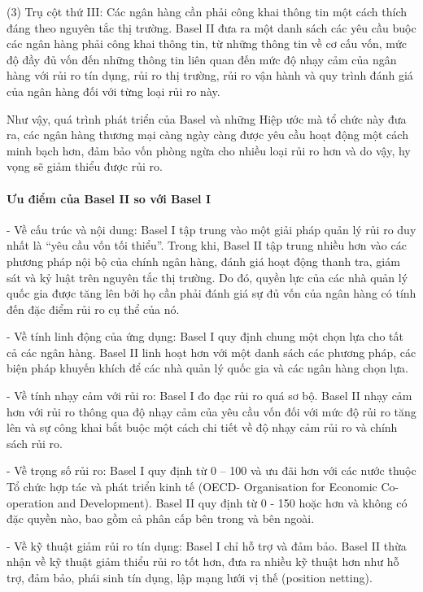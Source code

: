(3) Trụ cột thứ III: Các ngân hàng cần phải công khai thông tin một cách thích đáng theo nguyên tắc thị trường. Basel II đưa ra một danh sách các yêu cầu buộc các ngân hàng phải công khai thông tin, từ những thông tin về cơ cấu vốn, mức độ đầy đủ vốn đến những thông tin liên quan đến mức độ nhạy cảm của ngân hàng với rủi ro tín dụng, rủi ro thị trường, rủi ro vận hành và quy trình đánh giá của ngân hàng đối với từng loại rủi ro này.

Như vậy, quá trình phát triển của Basel và những Hiệp ước mà tổ chức này đưa ra, các ngân hàng thương mại càng ngày càng được yêu cầu hoạt động một cách minh bạch hơn, đảm bảo vốn phòng ngừa cho nhiều loại rủi ro hơn và do vậy, hy vọng sẽ giảm thiểu được rủi ro.

\paragraph{Ưu điểm của Basel II so với Basel I}

- Về cấu trúc và nội dung: Basel I tập trung vào một giải pháp quản lý rủi ro duy nhất là “yêu cầu vốn tối thiểu”. Trong khi, Basel II tập trung nhiều hơn vào các phương pháp nội bộ của chính ngân hàng, đánh giá hoạt động thanh tra, giám sát và kỷ luật trên nguyên tắc thị trường. Do đó, quyền lực của các nhà quản lý quốc gia được tăng lên bởi họ cần phải đánh giá sự đủ vốn của ngân hàng có tính đến đặc điểm rủi ro cụ thể của nó.

- Về tính linh động của ứng dụng: Basel I quy định chung một chọn lựa cho tất cả các ngân hàng. Basel II linh hoạt hơn với một danh sách các phương pháp, các biện pháp khuyến khích để các nhà quản lý quốc gia và các ngân hàng chọn lựa.

- Về tính nhạy cảm với rủi ro: Basel I đo đạc rủi ro quá sơ bộ. Basel II nhạy cảm hơn với rủi ro thông qua độ nhạy cảm của yêu cầu vốn đối với mức độ rủi ro tăng lên và sự công khai bắt buộc một cách chi tiết về độ nhạy cảm rủi ro và chính sách rủi ro.

- Về trọng số rủi ro: Basel I quy định từ 0 – 100 và ưu đãi hơn với các nước thuộc Tổ chức hợp tác và phát triển kinh tế (OECD- Organisation for Economic Co-operation and Development). Basel II quy định từ 0 - 150 hoặc hơn và không có đặc quyền nào, bao gồm cả phân cấp bên trong và bên ngoài.

- Về kỹ thuật giảm rủi ro tín dụng: Basel I chỉ hỗ trợ và đảm bảo. Basel II thừa nhận về kỹ thuật giảm thiểu rủi ro tốt hơn, đưa ra nhiều kỹ thuật hơn như hỗ trợ, đảm bảo, phái sinh tín dụng, lập mạng lưới vị thế (position netting).


